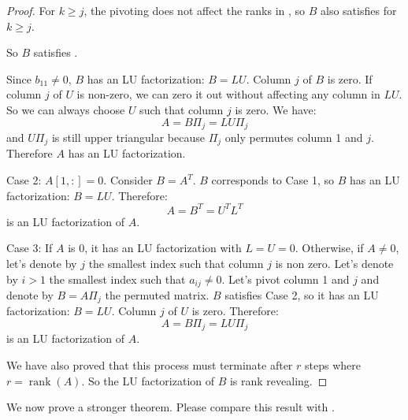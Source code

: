 \documentclass[10pt,twoside]{siamart1116}
\DeclareMathOperator{\rk}{rank}
\numberwithin{theorem}{section}
\begin{document}
\begin{proof}
	For $k \ge j$, the pivoting does not affect the ranks in , so $B$ also satisfies  for $k \ge j$.

	So $B$ satisfies .

	Since $b_{11} \neq 0$, $B$ has an LU factorization: $B = LU$. Column $j$ of $B$ is zero. If column $j$ of $U$ is non-zero, we can zero it out without affecting any column in $LU$. So we can always choose $U$ such that column $j$ is zero. We have:
	\[ A = B \Pi_j = L U \Pi_j \]
	and $U \Pi_j$ is still upper triangular because $\Pi_j$ only permutes column 1 and $j$. Therefore $A$ has an LU factorization.

	Case 2: $A[1,:] = 0$. Consider $B = A^T$. $B$ corresponds to Case 1, so $B$ has an LU factorization: $B = L U$. Therefore:
	\[ A = B^T = U^T L^T \]
	is an LU factorization of $A$.

	Case 3: If $A$ is 0, it has an LU factorization with $L=U=0$. Otherwise, if $A \neq 0$, let's denote by $j$ the smallest index such that column $j$ is non zero. Let's denote by $i > 1$ the smallest index such that $a_{ij} \neq 0$. Let's pivot column 1 and $j$ and denote by $B = A \Pi_j$ the permuted matrix. $B$ satisfies Case 2, so it has an LU factorization: $B = L U$. Column $j$ of $U$ is zero. Therefore:
	\[ A = B \Pi_j = L U \Pi_j \]
	is an LU factorization of $A$.

	We have also proved that this process must terminate after $r$ steps where $r = \rk(A)$. So the LU factorization of $B$ is rank revealing.
\end{proof}

We now prove a stronger theorem. Please compare this result with .
\end{document}
